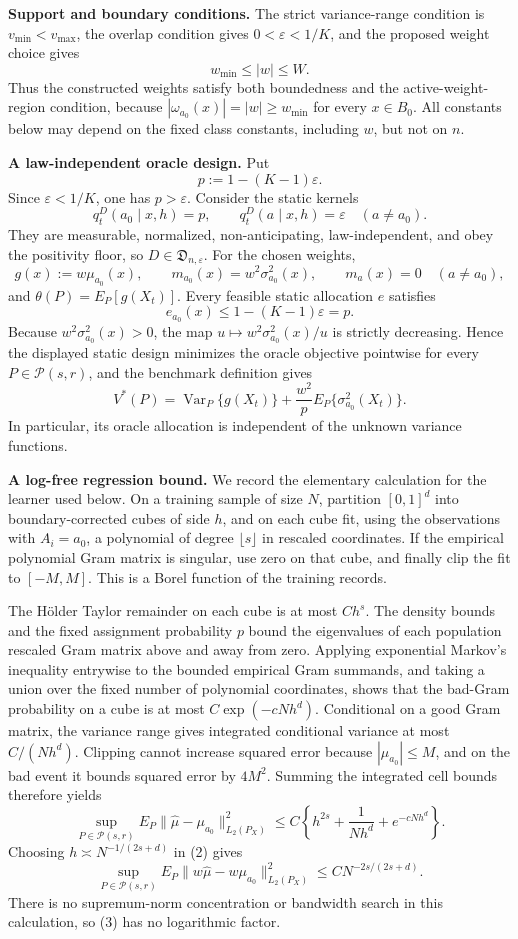 \textbf{Support and boundary conditions.}
The strict variance-range condition is \(v_{\min}<v_{\max}\), the overlap condition gives \(0<\varepsilon<1/K\), and the proposed weight choice gives
\[
w_{\min}\leq |w|\leq W.
\]
Thus the constructed weights satisfy both boundedness and the active-weight-region condition, because \(|\omega_{a_0}(x)|=|w|\geq w_{\min}\) for every \(x\in B_0\).  All constants below may depend on the fixed class constants, including \(w\), but not on \(n\).

\textbf{A law-independent oracle design.}
Put
\[
p:=1-(K-1)\varepsilon.
\]
Since \(\varepsilon<1/K\), one has \(p>\varepsilon\).  Consider the static kernels
\[
q_t^D(a_0\mid x,h)=p,
\qquad
q_t^D(a\mid x,h)=\varepsilon\quad(a\neq a_0).
\]
They are measurable, normalized, non-anticipating, law-independent, and obey the positivity floor, so \(D\in\mathfrak D_{n,\varepsilon}\).  For the chosen weights,
\[
g(x):=w\mu_{a_0}(x),
\qquad
m_{a_0}(x)=w^2\sigma_{a_0}^2(x),
\qquad
m_a(x)=0\quad(a\neq a_0),
\]
and \(\theta(P)=E_P[g(X_t)]\).  Every feasible static allocation \(e\) satisfies
\[
e_{a_0}(x)\leq 1-(K-1)\varepsilon=p.
\]
Because \(w^2\sigma_{a_0}^2(x)>0\), the map \(u\mapsto w^2\sigma_{a_0}^2(x)/u\) is strictly decreasing.  Hence the displayed static design minimizes the oracle objective pointwise for every \(P\in\mathcal P(s,r)\), and the benchmark definition gives
\[
V^*(P)=\operatorname{Var}_P\{g(X_t)\}
+\frac{w^2}{p}E_P\{\sigma_{a_0}^2(X_t)\}.
\tag{1}
\]
In particular, its oracle allocation is independent of the unknown variance functions.

\textbf{A log-free regression bound.}
We record the elementary calculation for the learner used below.  On a training sample of size \(N\), partition \([0,1]^d\) into boundary-corrected cubes of side \(h\), and on each cube fit, using the observations with \(A_i=a_0\), a polynomial of degree \(\lfloor s\rfloor\) in rescaled coordinates.  If the empirical polynomial Gram matrix is singular, use zero on that cube, and finally clip the fit to \([-M,M]\).  This is a Borel function of the training records.

The Hölder Taylor remainder on each cube is at most \(C h^s\).  The density bounds and the fixed assignment probability \(p\) bound the eigenvalues of each population rescaled Gram matrix above and away from zero.  Applying exponential Markov's inequality entrywise to the bounded empirical Gram summands, and taking a union over the fixed number of polynomial coordinates, shows that the bad-Gram probability on a cube is at most \(C\exp(-cNh^d)\).  Conditional on a good Gram matrix, the variance range gives integrated conditional variance at most \(C/(Nh^d)\).  Clipping cannot increase squared error because \(|\mu_{a_0}|\leq M\), and on the bad event it bounds squared error by \(4M^2\).  Summing the integrated cell bounds therefore yields
\[
\sup_{P\in\mathcal P(s,r)}
E_P\|\widehat\mu-\mu_{a_0}\|_{L_2(P_X)}^2
\leq C\left\{h^{2s}+\frac{1}{Nh^d}+e^{-cNh^d}\right\}.
\tag{2}
\]
Choosing \(h\asymp N^{-1/(2s+d)}\) in (2) gives
\[
\sup_{P\in\mathcal P(s,r)}
E_P\|w\widehat\mu-w\mu_{a_0}\|_{L_2(P_X)}^2
\leq C N^{-2s/(2s+d)}.
\tag{3}
\]
There is no supremum-norm concentration or bandwidth search in this calculation, so (3) has no logarithmic factor.

